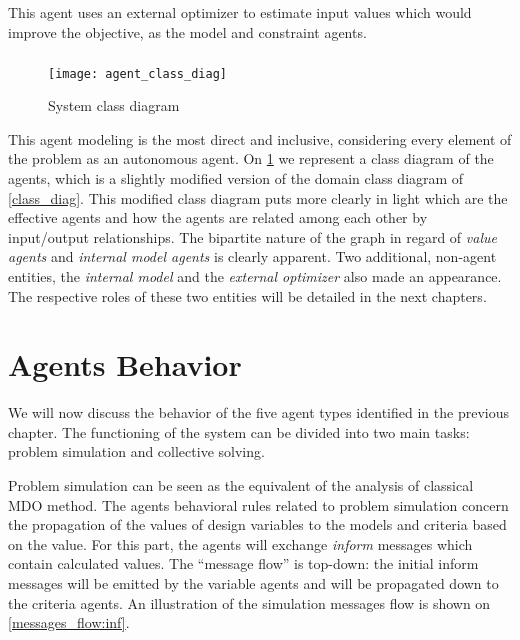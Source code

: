 This agent uses an external optimizer to estimate input values which would improve the objective, as the model and constraint agents.

\paragraph*{}

\begin{figure}
\texttt{[image: agent\_class\_diag]}
\caption{System class diagram}\label{SMA_class_diagram}
\end{figure}

This agent modeling is the most direct and inclusive, considering every element of the problem as an autonomous agent. On \figurename{} \ref{SMA_class_diagram} we represent a class diagram of the agents, which is a slightly modified version of the domain class diagram of \figurename{} \ref{class_diag}. This modified class diagram puts more clearly in light which are the effective agents and how the agents are related among each other by input/output relationships. The bipartite nature of the graph in regard of \emph{value agents} and \emph{internal model agents} is clearly apparent. Two additional, non-agent entities, the  \emph{internal model} and the \emph{external optimizer} also made an appearance. The respective roles of these two entities will be detailed in the next chapters.

\chapter{Agents Behavior}\label{agent_behav_chap}

We will now discuss the behavior of the five agent types identified in the previous chapter. The functioning of the system can be divided into two main tasks: problem simulation and collective solving.

Problem simulation can be seen as the equivalent of the analysis of classical MDO method. The agents behavioral rules related to problem simulation concern the propagation of the values of design variables to the models and criteria based on the value. For this part, the agents will exchange \emph{inform} messages which contain calculated values. The \enquote{message flow} is top-down: the initial inform messages will be emitted by the variable agents and will be propagated down to the criteria agents. An illustration of the simulation messages flow is shown on \figurename{} \ref{messages_flow:inf}.

